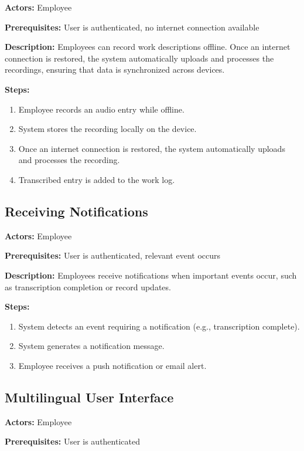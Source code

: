 \documentclass[
  digital,     %
  oneside,     %
  nosansbold,  %
  nocolorbold, %
  lof,         %
  lot,         %
]{fithesis4}
\begin{document}
\noindent \textbf{Actors:} Employee

\noindent \textbf{Prerequisites:} User is authenticated, no internet connection available

\noindent \textbf{Description:}  
Employees can record work descriptions offline. Once an internet connection is restored, the system automatically uploads and processes the recordings, ensuring that data is synchronized across devices.

\noindent \textbf{Steps:}
\begin{enumerate}
    \item Employee records an audio entry while offline.
    \item System stores the recording locally on the device.
    \item Once an internet connection is restored, the system automatically uploads and processes the recording.
    \item Transcribed entry is added to the work log.
\end{enumerate}

\subsection{Receiving Notifications}

\noindent \textbf{Actors:} Employee

\noindent \textbf{Prerequisites:} User is authenticated, relevant event occurs

\noindent \textbf{Description:}  
Employees receive notifications when important events occur, such as transcription completion or record updates.

\noindent \textbf{Steps:}
\begin{enumerate}
    \item System detects an event requiring a notification (e.g., transcription complete).
    \item System generates a notification message.
    \item Employee receives a push notification or email alert.
\end{enumerate}

\subsection{Multilingual User Interface}

\noindent \textbf{Actors:} Employee

\noindent \textbf{Prerequisites:} User is authenticated
\end{document}
